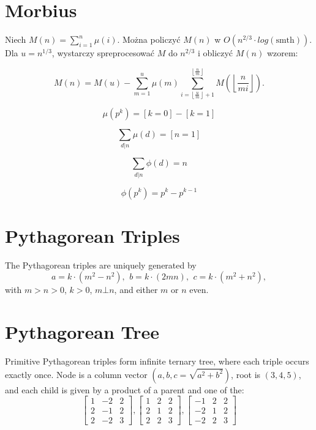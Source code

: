 \section{Morbius}
	Niech $M(n) = \sum_{i = 1}^n \mu(i)$.
	Można policzyć $M(n)$ w $O \left( n^{2/3} \cdot log(\textrm{smth}) \right)$.
	Dla $u = n^{1 / 3}$, wystarczy spreprocesować $M$ do $n^{2 / 3}$
	  i obliczyć $M(n)$ wzorem:
	
	\[
	  M(n) = M(u) - \sum_{m = 1}^u \mu(m)
		  \sum_{i = \left\lfloor \frac{u}{m}
				\right\rfloor + 1}^{\left\lfloor \frac{n}{m} \right\rfloor}
			 M \left( \left\lfloor \frac{n}{mi} \right\rfloor \right).
	\]

	\[
		\mu(p^k) = [k=0] - [k=1]
	\]

	\[
		\sum_{d | n} \mu(d) = [n = 1]
	\]

	\[
		\sum_{d | n} \phi(d) = n
	\]

	\[
		\phi(p^k) = p^k - p^{k-1}
	\]


\section{Pythagorean Triples}
	The Pythagorean triples are uniquely generated by
	\[ a=k\cdot (m^{2}-n^{2}),\ \,b=k\cdot (2mn),\ \,c=k\cdot (m^{2}+n^{2}), \]
	with $m > n > 0$, $k > 0$, $m \bot n$, and either $m$ or $n$ even.

\section{Pythagorean Tree}
	Primitive Pythagorean triples form infinite ternary tree, where each triple occurs exactly once.
	Node is a column vector $(a, b, c = \sqrt{a^2+b^2})$, root is $(3, 4, 5)$, and each child is given by a product of a parent and one of the:
	$$
	\begin{bmatrix}
		1 & -2 & 2\\
		2 & -1 & 2\\
		2 & -2 & 3
	\end{bmatrix},
	\begin{bmatrix}
		1 & 2 & 2\\
		2 & 1 & 2\\
		2 & 2 & 3
	\end{bmatrix},
	\begin{bmatrix}
		-1 & 2 & 2\\
		-2 & 1 & 2\\
		-2 & 2 & 3
	\end{bmatrix}
	$$

